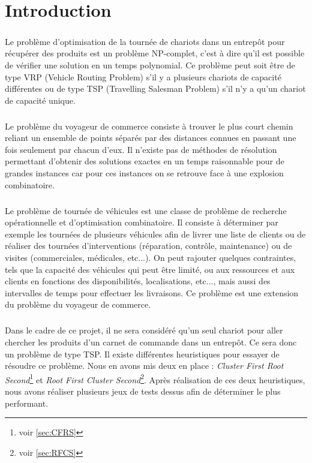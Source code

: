 \documentclass[twoside,UTF8]{EPURapport}
\begin{document}

\chapter{Introduction}

\paragraph{}
Le problème d'optimisation de la tournée de chariots dans un entrepôt pour récupérer des produits est un problème NP-complet, c'est à dire qu'il est possible de vérifier une solution en un temps polynomial. Ce problème peut soit être de type VRP (Vehicle Routing Problem) s'il y a plusieurs chariots de capacité différentes ou de type TSP (Travelling Salesman Problem) s'il n'y a qu'un chariot de capacité unique. 
\paragraph{}
Le problème du voyageur de commerce consiste à trouver le plus court chemin reliant un ensemble de points séparés par des distances connues en passant une fois seulement par chacun d'eux. Il n'existe pas de méthodes de résolution permettant d'obtenir des solutions exactes en un temps raisonnable pour de grandes instances car pour ces instances on se retrouve face à une explosion combinatoire.
\paragraph{}
Le problème de tournée de véhicules est une classe de problème de recherche opérationnelle et d'optimisation combinatoire. Il consiste à déterminer par exemple les tournées de plusieurs véhicules afin de livrer une liste de clients ou de réaliser des tournées d'interventions (réparation, contrôle, maintenance) ou de visites (commerciales, médicales, etc...). On peut rajouter quelques contraintes, tels que la capacité des véhicules qui peut être limité, ou aux ressources et aux clients en fonctions des disponibilités, localisations, etc..., mais aussi des intervalles de temps pour effectuer les livraisons. Ce problème est une extension du problème du voyageur de commerce. 
\paragraph{}Dans le cadre de ce projet, il ne sera considéré qu'un seul chariot pour aller chercher les produits d'un carnet de commande dans un entrepôt. Ce sera donc un problème de type TSP. Il existe différentes heuristiques pour essayer de résoudre ce problème. Nous en avons mis deux en place : \textit{Cluster First Root Second}\footnote{voir \ref{sec:CFRS}} et \textit{Root First Cluster Second}\footnote{voir \ref{sec:RFCS}}. Après réalisation de ces deux heuristiques, nous avons réaliser plusieurs jeux de tests dessus afin de déterminer le plus performant.
\end{document}
